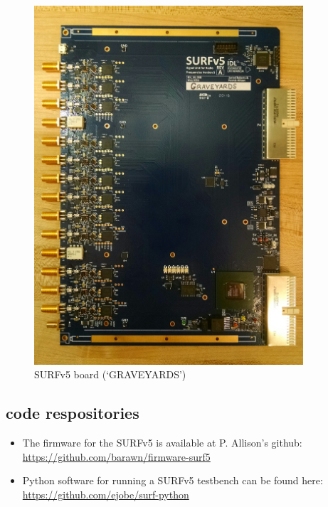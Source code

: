 \documentclass[11pt]{article}
\begin{document}
\begin{figure}[h!]
    \begin{center}
      \includegraphics[width=10cm]{fig/graveyards.jpg}

    \end{center}
    \caption{SURFv5 board (`GRAVEYARDS')}
    \label{fig:surf}
\end{figure}


\subsection{code respositories}
\label{code respositories}

\begin{itemize}
\item The firmware for the SURFv5 is available at P. Allison's github: \\\href{https://github.com/barawn/firmware-surf5}{https://github.com/barawn/firmware-surf5}

\item Python software for running a SURFv5 testbench can be found here: \\\href{https://github.com/ejobe/surf-pythoon}{https://github.com/ejobe/surf-python}
\end{itemize}
  
\end{document}
